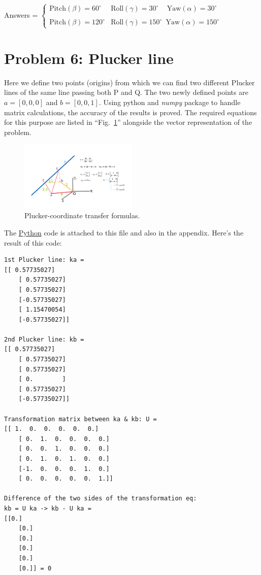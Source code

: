 \documentclass[conference]{IEEEtran}
\begin{document}
Answers = 
$
\begin{cases}
    \text{Pitch} (\beta) = 60^\circ & \text{Roll} (\gamma) = 30^\circ \quad \, \text{Yaw} (\alpha) = 30^\circ \\
    \\
    \text{Pitch} (\beta) = 120^\circ & \text{Roll} (\gamma) = 150^\circ \,\,\, \text{Yaw} (\alpha) = 150^\circ 
\end{cases}
$

\vspace{2cm}

\section{Problem 6: Plucker line}
Here we define two points (origins) from which we can find two different Plucker lines of the same line passing both P and Q. The two newly defined points are $a=[0, 0, 0]$ and $b=[0, 0, 1]$. Using python and \textit{numpy} package to handle matrix calculations, the accuracy of the results is proved. 
The required equations for this purpose are listed in ``Fig.~\ref{fig: prob_6}'' alongside the vector representation of the problem.

\begin{figure}[htbp]
    \centerline{\includegraphics[width=0.5\textwidth]{P6_image.png}}
    \caption{Plucker-coordinate transfer formulas.}
    \label{fig: prob_6}
\end{figure}

The \underline{Python} code is attached to this file and also in the appendix. Here's the result of this code:
\scriptsize
\begin{verbatim}
1st Plucker line: ka = 
[[ 0.57735027]
    [ 0.57735027]
    [ 0.57735027]
    [-0.57735027]
    [ 1.15470054]
    [-0.57735027]]

2nd Plucker line: kb =
[[ 0.57735027]
    [ 0.57735027]
    [ 0.57735027]
    [ 0.        ]
    [ 0.57735027]
    [-0.57735027]]

Transformation matrix between ka & kb: U =
[[ 1.  0.  0.  0.  0.  0.]
    [ 0.  1.  0.  0.  0.  0.]
    [ 0.  0.  1.  0.  0.  0.]
    [ 0.  1.  0.  1.  0.  0.]
    [-1.  0.  0.  0.  1.  0.]
    [ 0.  0.  0.  0.  0.  1.]]

Difference of the two sides of the transformation eq:
kb = U ka -> kb - U ka =
[[0.]
    [0.]
    [0.]
    [0.]
    [0.]
    [0.]] = 0
\end{verbatim}
\end{document}
